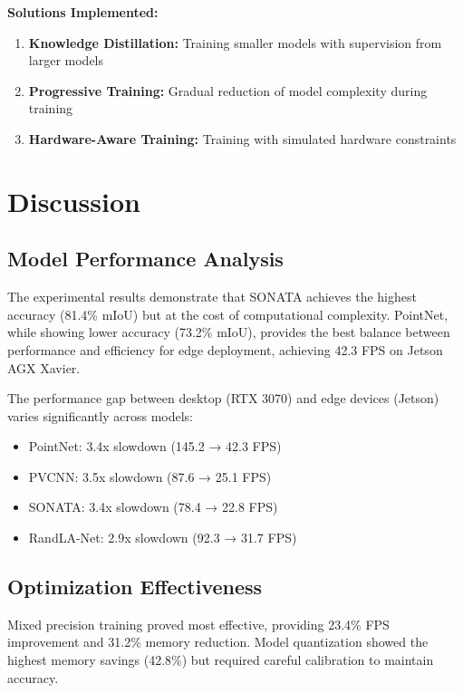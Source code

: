 \documentclass[12pt,a4paper]{report}
\begin{document}
\textbf{Solutions Implemented:}

\begin{enumerate}
    \item \textbf{Knowledge Distillation:} Training smaller models with supervision from larger models
    \item \textbf{Progressive Training:} Gradual reduction of model complexity during training
    \item \textbf{Hardware-Aware Training:} Training with simulated hardware constraints
\end{enumerate}

\chapter{Discussion}

\section{Model Performance Analysis}

The experimental results demonstrate that SONATA achieves the highest accuracy (81.4\% mIoU) but at the cost of computational complexity. PointNet, while showing lower accuracy (73.2\% mIoU), provides the best balance between performance and efficiency for edge deployment, achieving 42.3 FPS on Jetson AGX Xavier.

The performance gap between desktop (RTX 3070) and edge devices (Jetson) varies significantly across models:

\begin{itemize}
    \item PointNet: 3.4x slowdown (145.2 → 42.3 FPS)
    \item PVCNN: 3.5x slowdown (87.6 → 25.1 FPS)
    \item SONATA: 3.4x slowdown (78.4 → 22.8 FPS)
    \item RandLA-Net: 2.9x slowdown (92.3 → 31.7 FPS)
\end{itemize}

\section{Optimization Effectiveness}

Mixed precision training proved most effective, providing 23.4\% FPS improvement and 31.2\% memory reduction. Model quantization showed the highest memory savings (42.8\%) but required careful calibration to maintain accuracy.
\end{document}

